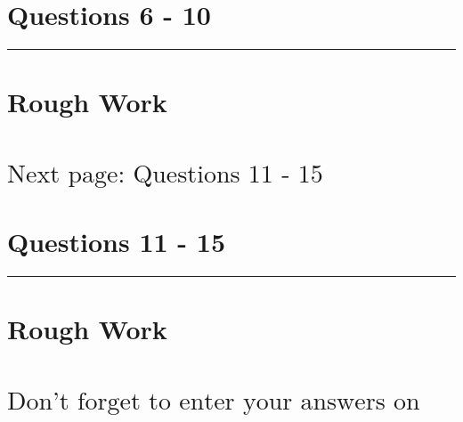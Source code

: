\documentclass[12pt]{article}
\begin{document}
\newpage


\section*{Questions 6 - 10}

\rule{\linewidth}{1pt}


\newpage

\section*{Rough Work\\[23cm]}
\section*{\hspace{8cm}$\boxed{\text{Next page: Questions 11 - 15}}$}

\newpage

\section*{Questions 11 - 15}

\rule{\linewidth}{1pt}






\newpage

\section*{Rough Work\\[23cm]}
\section*{\hspace{2cm}$\boxed{\text{Don't forget to enter your answers on the last page!}}$}

\newpage
\end{document}
